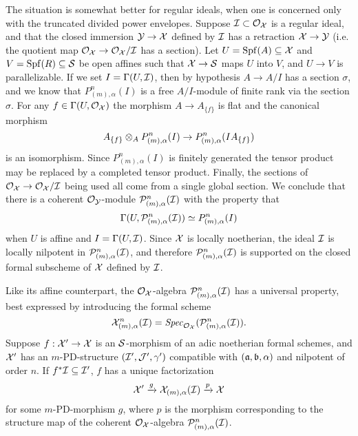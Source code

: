 \documentclass{article}
\theoremstyle{change}
\numberwithin{equation}{subsubsection}
\begin{document}
The situation is somewhat better for regular ideals, when one is
concerned only with the truncated divided power envelopes. Suppose
${\cal I}\subset{\cal O}_{\cal X}$ is a regular ideal, and that the closed immersion
${\cal Y}\to{\cal X}$ defined by ${\cal I}$ has a retraction ${\cal X}\to{\cal Y}$ (i.e. the
quotient map ${\cal O}_{\cal X}\to{\cal O}_{\cal X}/{\cal I}$ has a section). Let
$U={\operatorname{Spf}({A})}\subseteq{\cal X}$ and $V={\operatorname{Spf}({R})}\subseteq{\cal S}$ be open affines such that
${\cal X}\to{\cal S}$ maps $U$ into $V$, and $U\to V$ is parallelizable. If we
set $I=\Gamma(U,{\cal I})$, then by hypothesis $A\to A/I$ has a section
$\sigma$, and we know that $P^n_{(m),\alpha}(I)$ is a free
$A/I$-module of finite rank via the section $\sigma$. For any
$f\in\Gamma(U,{\cal O}_{\cal X})$ the morphism $A\to A_{\{f\}}$ is flat and the
canonical morphism
\begin{displaymath}
  A_{\{f\}}\otimes_AP^n_{(m),\alpha}(I)\to P^n_{(m),\alpha}(IA_{\{f\}})
\end{displaymath}
is an isomorphism. Since $P^n_{(m),\alpha}(I)$ is finitely generated
the tensor product may be replaced by a completed tensor
product. Finally, the sections of ${\cal O}_{\cal X}\to{\cal O}_{\cal X}/{\cal I}$ being used all
come from a single global section. We conclude that there is a
coherent ${\cal O}_{\cal Y}$-module ${\cal P}^n_{(m),\alpha}({\cal I})$ with the property
that
\begin{displaymath}
  \Gamma(U,{\cal P}^n_{(m),\alpha}({\cal I}))\simeq P^n_{(m),\alpha}(I)
\end{displaymath}
when $U$ is affine and $I=\Gamma(U,{\cal I})$. Since ${\cal X}$ is locally
noetherian, the ideal ${\cal I}$ is locally nilpotent in
${\cal P}^n_{(m),\alpha}({\cal I})$, and therefore ${\cal P}^n_{(m),\alpha}({\cal I})$ is
supported on the closed formal subscheme of ${\cal X}$ defined by ${\cal I}$.

Like its affine counterpart, the ${\cal O}_{\cal X}$-algebra
${\cal P}^n_{(m),\alpha}({\cal I})$ has a universal property, best expressed by
introducing the formal scheme
\begin{displaymath}
  {\cal X}^n_{(m),\alpha}({\cal I})={\mathit{Spec}_{{\cal O}_{\cal X}}({{\cal P}^n_{(m),\alpha}({\cal I})})}.
\end{displaymath}
Suppose $f:{\cal X}'\to{\cal X}$ is an ${\cal S}$-morphism of an adic noetherian
formal schemes, and ${\cal X}'$ has an $m$-PD-structure $({\cal I}',{\cal J}',\gamma')$
compatible with $({\mathfrak a},{\mathfrak b},\alpha)$ and nilpotent of order $n$. If
$f^*{\cal I}\subseteq{\cal I}'$, $f$ has a unique factorization
\begin{displaymath}
  {\cal X}'\xrightarrow{g}{\cal X}_{(m),\alpha}({\cal I})\xrightarrow{p}{\cal X}
\end{displaymath}
for some $m$-PD-morphism $g$, where $p$ is the morphism corresponding
to the structure map of the coherent ${\cal O}_{\cal X}$-algebra
${\cal P}^n_{(m),\alpha}({\cal I})$.
\end{document}
